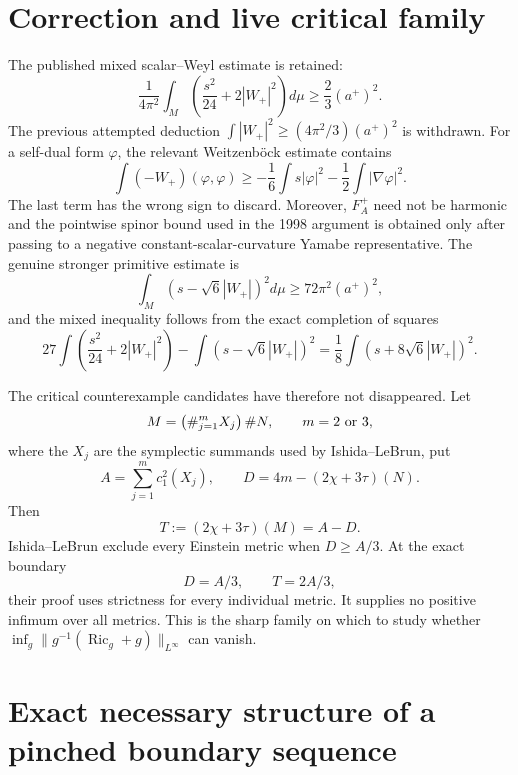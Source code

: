 
\section{Correction and live critical family}

The published mixed scalar--Weyl estimate is retained:
\[
 \frac1{4\pi^2}\int_M\left(\frac{s^2}{24}+2|W_+|^2\right)d\mu
 \geq \frac23(a^+)^2.
\]
The previous attempted deduction
\(\int|W_+|^2\ge(4\pi^2/3)(a^+)^2\) is withdrawn.  For a self-dual form \(\varphi\), the relevant Weitzenb\"ock estimate contains
\[
 \int(-W_+)(\varphi,\varphi)
 \geq -\frac16\int s|\varphi|^2-\frac12\int|\nabla\varphi|^2.
\]
The last term has the wrong sign to discard.  Moreover, \(F_A^+\) need not be harmonic and the pointwise spinor bound used in the 1998 argument is obtained only after passing to a negative constant-scalar-curvature Yamabe representative.  The genuine stronger primitive estimate is
\[
 \int_M(s-\sqrt6|W_+|)^2d\mu\ge72\pi^2(a^+)^2,
\]
and the mixed inequality follows from the exact completion of squares
\[
 27\int\left(\frac{s^2}{24}+2|W_+|^2\right)
 -\int(s-\sqrt6|W_+|)^2
 =\frac18\int(s+8\sqrt6|W_+|)^2.
\]

The critical counterexample candidates have therefore not disappeared.  Let
\[
 M=\left(\#_{j=1}^mX_j\right)\#N,\qquad m=2\ \hbox{or}\ 3,
\]
where the \(X_j\) are the symplectic summands used by Ishida--LeBrun, put
\[
 A=\sum_{j=1}^m c_1^2(X_j),\qquad
 D=4m-(2\chi+3\tau)(N).
\]
Then
\[
 T:=(2\chi+3\tau)(M)=A-D.
\]
Ishida--LeBrun exclude every Einstein metric when \(D\ge A/3\).  At the exact boundary
\[
 D=A/3,\qquad T=2A/3,
\]
their proof uses strictness for every individual metric.  It supplies no positive infimum over all metrics.  This is the sharp family on which to study whether
\(\inf_g\|g^{-1}(\operatorname{Ric}_g+g)\|_{L^\infty}\) can vanish.

\section{Exact necessary structure of a pinched boundary sequence}

